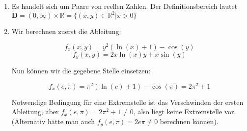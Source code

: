 \item

\begin{enumerate}

\item Es handelt sich um Paare von reellen Zahlen. Der Definitionsbereich lautet $\mathbf{D} = (0,\infty)\times\mathbb{R} = \lbrace (x,y) \in \mathbb{R}^2 | x > 0 \rbrace$

\item Wir berechnen zuerst die Ableitung:

$$f_x(x,y) = y^2 (\ln(x)+1) - \cos(y)$$
$$f_y(x,y) = 2x\ln(x)y +x\sin(y)$$

Nun können wir die gegebene Stelle einsetzen:

$$f_x(e,\pi) = \pi^2 (\ln(e)+1) - \cos(\pi) = 2\pi^2+1$$

Notwendige Bedingung für eine Extremstelle ist das Verschwinden der ersten Ableitung, aber $f_x(e, \pi) = 2\pi^2+1 \ne 0$, also liegt keine Extremstelle vor. (Alternativ hätte man auch $f_y(e,\pi)=2e\pi \ne 0$ berechnen können).

\end{enumerate}

